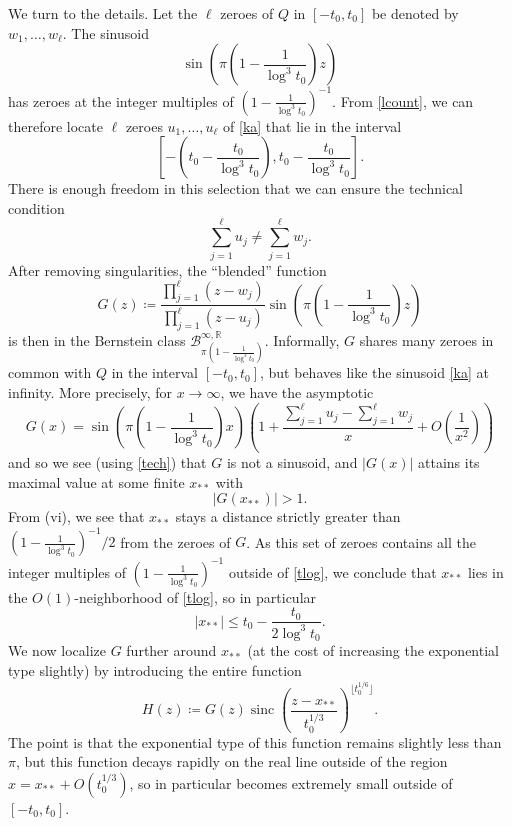 \documentclass[12pt]{amsart}
\newcommand{\R}{\mathbb{R}}
\newcommand{\sinc}{\operatorname{sinc}}
\begin{document}
We turn to the details. Let the $\ell$ zeroes of $Q$ in $[-t_0,t_0]$ be denoted by $w_1,\dots,w_\ell$.  The sinusoid
\begin{equation}\label{ka}
 \sin\left( \pi \left(1 - \frac{1}{\log^3 t_0}\right) z\right)
\end{equation}
has zeroes at the integer multiples of $(1 - \frac{1}{\log^3 t_0})^{-1}$.
From \eqref{lcount}, we can therefore locate $\ell$ zeroes $u_1,\dots,u_\ell$ of \eqref{ka} that lie in the interval
\begin{equation}\label{tlog}
 \left[-\left(t_0-\frac{t_0}{\log^3 t_0}\right), t_0 - \frac{t_0}{\log^3 t_0}\right].
\end{equation}
There is enough freedom in this selection that we can ensure the technical condition
\begin{equation}\label{tech}
 \sum_{j=1}^\ell u_j \neq \sum_{j=1}^\ell w_j.
\end{equation}
After removing singularities, the ``blended'' function
$$ G(z) \coloneqq \frac{\prod_{j=1}^\ell (z-w_j)}{\prod_{j=1}^\ell (z-u_j)} \sin\left( \pi \left(1 - \frac{1}{\log^3 t_0}\right) z\right) $$
is then in the Bernstein class ${\mathcal B}^{\infty,\R}_{\pi(1 - \frac{1}{\log^3 t_0})}$.  Informally, $G$ shares many zeroes in common with $Q$ in the interval $[-t_0,t_0]$, but behaves like the sinusoid \eqref{ka} at infinity.  More precisely, for $x \to \infty$, we have the asymptotic
$$ G(x) = \sin\left( \pi \left(1 - \frac{1}{\log^3 t_0}\right) x\right)
\left(1 + \frac{\sum_{j=1}^\ell u_j - \sum_{j=1}^\ell w_j}{x} + O\left(\frac{1}{x^2}\right)\right)$$
and so we see (using \eqref{tech}) that $G$ is not a sinusoid, and $|G(x)|$ attains its maximal value at some finite $x_{**}$ with
\begin{equation}\label{gx1}
|G(x_{**})| > 1.
\end{equation}
From (vi), we see that $x_{**}$ stays a distance strictly greater than $(1 - \frac{1}{\log^3 t_0})^{-1}/2$ from the zeroes of $G$.  As this set of zeroes contains all the integer multiples of $(1 - \frac{1}{\log^3 t_0})^{-1}$ outside of \eqref{tlog}, we conclude that $x_{**}$ lies in the $O(1)$-neighborhood of \eqref{tlog}, so in particular
\begin{equation}\label{xst}
 |x_{**}| \leq t_0 - \frac{t_0}{2\log^3 t_0}.
\end{equation}
We now localize $G$ further around $x_{**}$ (at the cost of increasing the exponential type slightly) by introducing the entire function
\begin{equation}\label{hforth}
 H(z) \coloneqq G(z) \sinc\left(\frac{z - x_{**}}{t_0^{1/3}}\right)^{\lfloor t_0^{1/6} \rfloor}.
\end{equation}
The point is that the exponential type of this function remains slightly less than $\pi$, but this function decays rapidly on the real line outside of the region $x = x_{**} + O(t_0^{1/3})$, so in particular becomes extremely small outside of $[-t_0,t_0]$.
\end{document}

